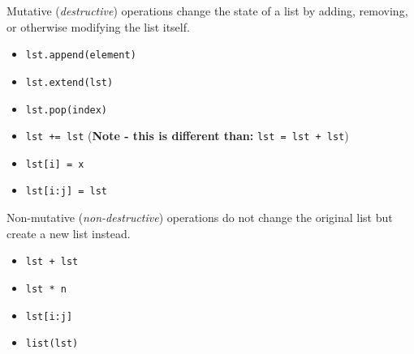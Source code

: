 \begin{blocksection}
Mutative (\emph{destructive}) operations change the state of a list by adding,
removing, or otherwise modifying the list itself.

\begin{itemize}
\item \lstinline$lst.append(element)$
\item \lstinline$lst.extend(lst)$
\item \lstinline$lst.pop(index)$
\item \lstinline$lst += lst$ (\textbf{Note - this is different than:} \lstinline$lst = lst + lst$)
\item \lstinline$lst[i] = x$
\item \lstinline$lst[i:j] = lst$
\end{itemize}
\end{blocksection}

\vspace{\parskip}

\begin{blocksection}
Non-mutative (\emph{non-destructive}) operations do not change the original list but create a new list instead.

\begin{itemize}
\item \lstinline$lst + lst$
\item \lstinline$lst * n$
\item \lstinline$lst[i:j]$
\item \lstinline$list(lst)$
\end{itemize}
\end{blocksection}

\vspace{\parskip}
